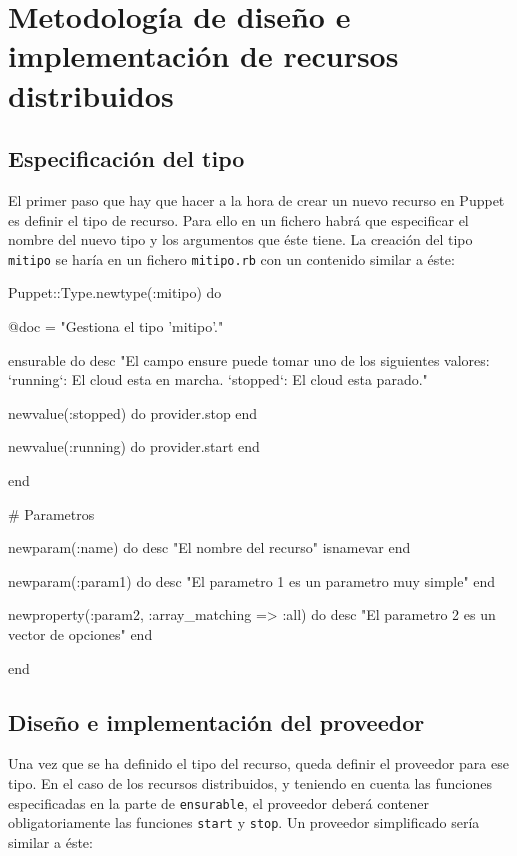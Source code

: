 \chapter{Metodología de diseño e implementación de recursos distribuidos}
\label{cap:disenyo}


\section{Especificación del tipo}

El primer paso que hay que hacer a la hora de crear un nuevo recurso en Puppet es definir el tipo de recurso. Para ello en un fichero habrá que especificar el nombre del nuevo tipo y los argumentos que éste tiene. La creación del tipo \texttt{mitipo} se haría en un fichero \texttt{mitipo.rb} con un contenido similar a éste:

\begin{rubycode}
Puppet::Type.newtype(:mitipo) do

   @doc = "Gestiona el tipo 'mitipo'."
   
   ensurable do
      desc "El campo ensure puede tomar uno de los siguientes valores:
   `running`: El cloud esta en marcha.
   `stopped`: El cloud esta parado.\n"
   
      newvalue(:stopped) do
         provider.stop
      end

      newvalue(:running) do
         provider.start
      end

   end

   # Parametros
   
   newparam(:name) do
      desc "El nombre del recurso"
      isnamevar
   end

   newparam(:param1) do
      desc "El parametro 1 es un parametro muy simple"
   end
   
   newproperty(:param2, :array_matching => :all) do
      desc "El parametro 2 es un vector de opciones"
   end

end
\end{rubycode}


\section{Diseño e implementación del proveedor}

Una vez que se ha definido el tipo del recurso, queda definir el proveedor para ese tipo. En el caso de los recursos distribuidos, y teniendo en cuenta las funciones especificadas en la parte de \texttt{ensurable}, el proveedor deberá contener obligatoriamente las funciones \texttt{start} y \texttt{stop}. Un proveedor simplificado sería similar a éste:

